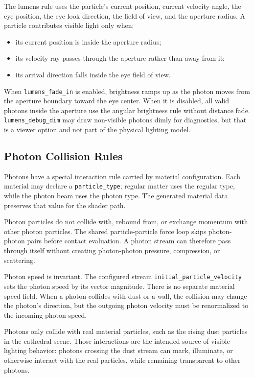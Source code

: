 The lumens rule uses the particle's current position, current velocity angle,
the eye position, the eye look direction, the field of view, and the aperture
radius.  A particle contributes visible light only when:
\begin{itemize}
    \item its current position is inside the aperture radius;
    \item its velocity ray passes through the aperture rather than away from
          it;
    \item its arrival direction falls inside the eye field of view.
\end{itemize}

When \texttt{lumens\_fade\_in} is enabled, brightness ramps up as the photon
moves from the aperture boundary toward the eye center.  When it is disabled,
all valid photons inside the aperture use the angular brightness rule without
distance fade.  \texttt{lumens\_debug\_dim} may draw non-visible photons dimly
for diagnostics, but that is a viewer option and not part of the physical
lighting model.

\subsection{Photon Collision Rules}

Photons have a special interaction rule carried by material configuration.
Each material may declare a \texttt{particle\_type}; regular matter uses the
regular type, while the photon beam uses the photon type.  The generated
material data preserves that value for the shader path.

Photon particles do not collide with, rebound from, or exchange momentum with
other photon particles.  The shared particle-particle force loop skips
photon-photon pairs before contact evaluation.  A photon stream can therefore
pass through itself without creating photon-photon pressure, compression, or
scattering.

Photon speed is invariant.  The configured stream
\texttt{initial\_particle\_velocity} sets the photon speed by its vector
magnitude.  There is no separate material speed field.  When a photon collides
with dust or a wall, the collision may change the photon's direction, but the
outgoing photon velocity must be renormalized to the incoming photon speed.

Photons only collide with real material particles, such as the rising dust
particles in the cathedral scene.  Those interactions are the intended source
of visible lighting behavior: photons crossing the dust stream can mark,
illuminate, or otherwise interact with the real particles, while remaining
transparent to other photons.

